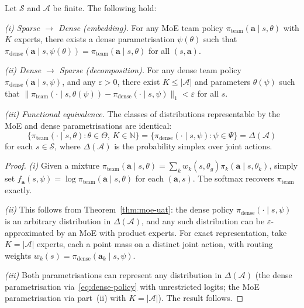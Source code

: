 \begin{theorem}\label{thm:dense-sparse-iso}
Let $\mathcal{S}$ and $\bm{\mathcal{A}}$ be finite. The following hold:

\medskip\noindent\emph{(i) Sparse $\to$ Dense (embedding).} For any MoE team policy $\pi_{\mathrm{team}}(\bm{a}\mid s,\theta)$ with $K$ experts, there exists a dense parametrisation $\psi(\theta)$ such that $\pi_{\mathrm{dense}}(\bm{a}\mid s,\psi(\theta))=\pi_{\mathrm{team}}(\bm{a}\mid s,\theta)$ for all $(s,\bm{a})$.

\medskip\noindent\emph{(ii) Dense $\to$ Sparse (decomposition).} For any dense team policy $\pi_{\mathrm{dense}}(\bm{a}\mid s,\psi)$, and any $\varepsilon>0$, there exist $K\le|\bm{\mathcal{A}}|$ and parameters $\theta(\psi)$ such that $\|\pi_{\mathrm{team}}(\cdot\mid s,\theta(\psi))-\pi_{\mathrm{dense}}(\cdot\mid s,\psi)\|_1<\varepsilon$ for all $s$.

\medskip\noindent\emph{(iii) Functional equivalence.} The classes of distributions representable by the MoE and dense parametrisations are identical:
\begin{equation}\label{eq:iso}
  \bigl\{\pi_{\mathrm{team}}(\cdot\mid s,\theta):\theta\in\Theta,\,K\in\mathbb{N}\bigr\} = \bigl\{\pi_{\mathrm{dense}}(\cdot\mid s,\psi):\psi\in\Psi\bigr\} = \Delta(\bm{\mathcal{A}})
\end{equation}
for each $s\in\mathcal{S}$, where $\Delta(\bm{\mathcal{A}})$ is the probability simplex over joint actions.
\end{theorem}

\begin{proof}
\emph{(i)} Given a mixture $\pi_{\mathrm{team}}(\bm{a}\mid s,\theta)=\sum_k w_k(s,\theta_g)\pi_k(\bm{a}\mid s,\theta_k)$, simply set $f_{\bm{a}}(s,\psi)=\log\pi_{\mathrm{team}}(\bm{a}\mid s,\theta)$ for each $(\bm{a},s)$. The softmax recovers $\pi_{\mathrm{team}}$ exactly.

\emph{(ii)} This follows from Theorem~\ref{thm:moe-uat}: the dense policy $\pi_{\mathrm{dense}}(\cdot\mid s,\psi)$ is an arbitrary distribution in $\Delta(\bm{\mathcal{A}})$, and any such distribution can be $\varepsilon$-approximated by an MoE with product experts. For exact representation, take $K=|\bm{\mathcal{A}}|$ experts, each a point mass on a distinct joint action, with routing weights $w_k(s)=\pi_{\mathrm{dense}}(\bm{a}_k\mid s,\psi)$.

\emph{(iii)} Both parametrisations can represent any distribution in $\Delta(\bm{\mathcal{A}})$ (the dense parametrisation via~\eqref{eq:dense-policy} with unrestricted logits; the MoE parametrisation via part~(ii) with $K=|\bm{\mathcal{A}}|$). The result follows.
\end{proof}


